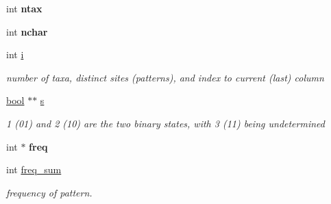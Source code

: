 \begin{DoxyCompactItemize}
\item 
\mbox{\label{structbinary__parsimony__datamatrix__struct_a424911f4f74135af958f97f25ceaf4ad}} 
int {\bfseries ntax}
\item 
\mbox{\label{structbinary__parsimony__datamatrix__struct_ad2e17453dc6a1835683753232d5b9412}} 
int {\bfseries nchar}
\item 
\mbox{\label{structbinary__parsimony__datamatrix__struct_a673bd1a74e442138332c4c8321f54949}} 
int \hyperlink{structbinary__parsimony__datamatrix__struct_a673bd1a74e442138332c4c8321f54949}{i}
\begin{DoxyCompactList}\small\item\em number of taxa, distinct sites (patterns), and index to current (last) column \end{DoxyCompactList}\item 
\mbox{\label{structbinary__parsimony__datamatrix__struct_a137caa1e489a54f80fa6e517b6f9626d}} 
\hyperlink{lowlevel_8h_a97a80ca1602ebf2303258971a2c938e2}{bool} $\ast$$\ast$ \hyperlink{structbinary__parsimony__datamatrix__struct_a137caa1e489a54f80fa6e517b6f9626d}{s}
\begin{DoxyCompactList}\small\item\em 1 (01) and 2 (10) are the two binary states, with 3 (11) being undetermined \end{DoxyCompactList}\item 
\mbox{\label{structbinary__parsimony__datamatrix__struct_a246a8e030ece949dc7a0c48946900258}} 
int $\ast$ {\bfseries freq}
\item 
\mbox{\label{structbinary__parsimony__datamatrix__struct_ac58346b932eae6dc2cc2ee8857076073}} 
int \hyperlink{structbinary__parsimony__datamatrix__struct_ac58346b932eae6dc2cc2ee8857076073}{freq\+\_\+sum}
\begin{DoxyCompactList}\small\item\em frequency of pattern. \end{DoxyCompactList}\item 
$$
\end{DoxyCompactItemize}
